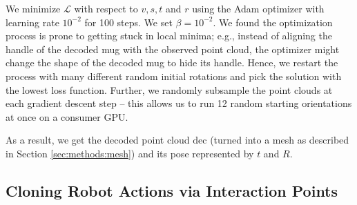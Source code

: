 \documentclass{article}
\begin{document}
We minimize $\mathcal{L}$ with respect to $v, s, t$ and $r$ using the Adam optimizer \cite{kingma17adam} with learning rate $10^{-2}$ for 100 steps. We set $\beta=10^{-2}$. We found the optimization process is prone to getting stuck in local minima; e.g., instead of aligning the handle of the decoded mug with the observed point cloud, the optimizer might change the shape of the decoded mug to hide its handle. Hence, we restart the process with many different random initial rotations and pick the solution with the lowest loss function. Further, we randomly subsample the point clouds at each gradient descent step -- this allows us to run 12 random starting orientations at once on a consumer GPU.

As a result, we get the decoded point cloud $\mathrm{dec}$ (turned into a mesh as described in Section \ref{sec:methods:mesh}) and its pose represented by $t$ and $R$.

\subsection{Cloning Robot Actions via Interaction Points}
\end{document}
